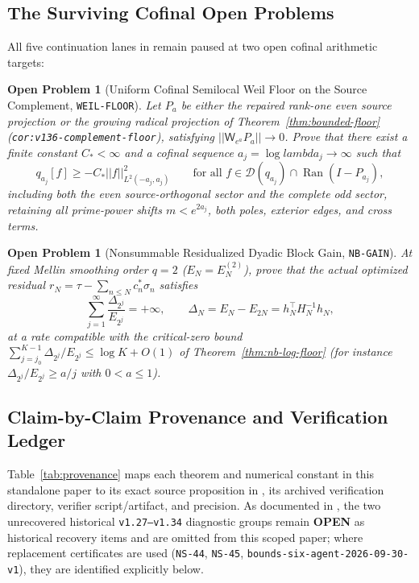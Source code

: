 \documentclass[11pt]{article}
\def\lambda{lambda}%
\def\norm#1{||#1||}%
\newtheorem{openproblem}[theorem]{Open Problem}
\theoremstyle{remark}
\newcommand{\norm}[1]{\left\lVert #1\right\rVert}
\begin{document}
\subsection{The Surviving Cofinal Open Problems}
All five continuation lanes in  remain paused at two open cofinal arithmetic targets:

\begin{openproblem}[Uniform Cofinal Semilocal Weil Floor on the Source Complement, \texttt{WEIL-FLOOR}]
\label{prob:weil-floor}
Let $P_a$ be either the repaired rank-one even source projection or the growing radical projection of Theorem~\ref{thm:bounded-floor} (\texttt{cor:v136-complement-floor}), satisfying $\norm{\mathsf{W}_{e^a}P_a} \to 0$. Prove that there exist a finite constant $C_* < \infty$ and a cofinal sequence $a_j = \log\lambda_j \to \infty$ such that
\begin{equation}
  q_{a_j}[f] \ge -C_*\norm{f}_{L^2(-a_j,a_j)}^2 \qquad \text{for all } f \in \mathcal{D}(q_{a_j}) \cap \operatorname{Ran}(I - P_{a_j}),
\end{equation}
including both the even source-orthogonal sector and the complete odd sector, retaining all prime-power shifts $m < e^{2a_j}$, both poles, exterior edges, and cross terms.
\end{openproblem}

\begin{openproblem}[Nonsummable Residualized Dyadic Block Gain, \texttt{NB-GAIN}]
\label{prob:nb-gain}
At fixed Mellin smoothing order $q = 2$ ($E_N = E_N^{(2)}$), prove that the actual optimized residual $r_N = \tau - \sum_{n\le N} c_n^*\sigma_n$ satisfies
\begin{equation}
  \sum_{j=1}^\infty \frac{\Delta_{2^j}}{E_{2^j}} = +\infty, \qquad \Delta_N = E_N - E_{2N} = h_N^\top H_N^{-1} h_N,
\end{equation}
at a rate compatible with the critical-zero bound $\sum_{j=j_0}^{K-1} \Delta_{2^j}/E_{2^j} \le \log K + O(1)$ of Theorem~\ref{thm:nb-log-floor} (for instance $\Delta_{2^j}/E_{2^j} \ge a/j$ with $0 < a \le 1$).
\end{openproblem}

\subsection{Claim-by-Claim Provenance and Verification Ledger}
Table~\ref{tab:provenance} maps each theorem and numerical constant in this standalone paper to its exact source proposition in , its archived verification directory, verifier script/artifact, and precision. As documented in , the two unrecovered historical \texttt{v1.27--v1.34} diagnostic groups remain \textbf{OPEN} as historical recovery items and are omitted from this scoped paper; where replacement certificates are used (\texttt{NS-44}, \texttt{NS-45}, \texttt{bounds-six-agent-2026-09-30-v1}), they are identified explicitly below.
\end{document}

